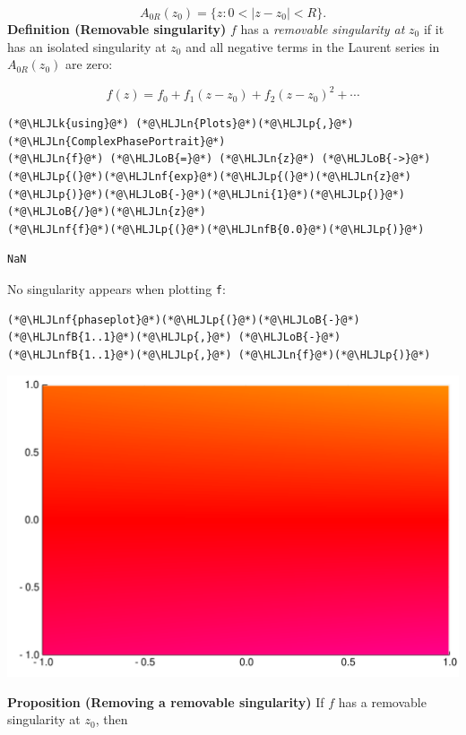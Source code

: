 \documentclass[12pt,a4paper]{article}
\newcommand{\HLJLk}[1]{\textcolor[RGB]{148,91,176}{\textbf{#1}}}
\newcommand{\HLJLn}[1]{#1}
\newcommand{\HLJLnf}[1]{\textcolor[RGB]{66,102,213}{#1}}
\newcommand{\HLJLnfB}[1]{\textcolor[RGB]{59,151,46}{#1}}
\newcommand{\HLJLni}[1]{\textcolor[RGB]{59,151,46}{#1}}
\newcommand{\HLJLoB}[1]{\textcolor[RGB]{102,102,102}{\textbf{#1}}}
\newcommand{\HLJLp}[1]{#1}
\begin{document}
\[
A_{0R}(z_0) = \{z : 0 < |z - z_0| < R \}.
\]
\textbf{Definition (Removable singularity)} $f$ has a \emph{removable singularity at} $z_0$ if it has an isolated singularity at $z_0$ and all negative terms in the Laurent series in $A_{0R}(z_0)$ are zero:

\[
f(z) = f_0 + f_1 (z-z_0) + f_2 (z-z_0)^2 + \cdots
\]

\begin{lstlisting}
(*@\HLJLk{using}@*) (*@\HLJLn{Plots}@*)(*@\HLJLp{,}@*) (*@\HLJLn{ComplexPhasePortrait}@*)
(*@\HLJLn{f}@*) (*@\HLJLoB{=}@*) (*@\HLJLn{z}@*) (*@\HLJLoB{->}@*) (*@\HLJLp{(}@*)(*@\HLJLnf{exp}@*)(*@\HLJLp{(}@*)(*@\HLJLn{z}@*)(*@\HLJLp{)}@*)(*@\HLJLoB{-}@*)(*@\HLJLni{1}@*)(*@\HLJLp{)}@*)(*@\HLJLoB{/}@*)(*@\HLJLn{z}@*)
(*@\HLJLnf{f}@*)(*@\HLJLp{(}@*)(*@\HLJLnfB{0.0}@*)(*@\HLJLp{)}@*)
\end{lstlisting}

\begin{lstlisting}
NaN
\end{lstlisting}


No singularity appears when plotting \texttt{f}:


\begin{lstlisting}
(*@\HLJLnf{phaseplot}@*)(*@\HLJLp{(}@*)(*@\HLJLoB{-}@*)(*@\HLJLnfB{1..1}@*)(*@\HLJLp{,}@*) (*@\HLJLoB{-}@*)(*@\HLJLnfB{1..1}@*)(*@\HLJLp{,}@*) (*@\HLJLn{f}@*)(*@\HLJLp{)}@*)
\end{lstlisting}

\includegraphics[width=\linewidth]{figures/Lecture3_2_1.pdf}

\textbf{Proposition (Removing a removable singularity)} If  $f$ has a removable singularity at $z_0$, then
\end{document}

